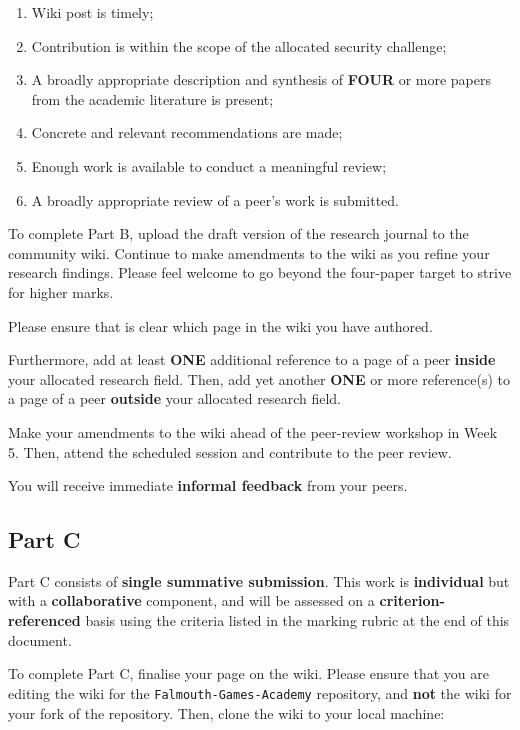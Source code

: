\documentclass{../../fal_assignment}
\begin{document}
\begin{enumerate}[label=(\alph*)]
	\item Wiki post is timely;
	\item Contribution is within the scope of the allocated security challenge;
	\item A broadly appropriate description and synthesis of \textbf{FOUR} or more papers from the academic literature is present;
	\item Concrete and relevant recommendations are made;
	\item Enough work is available to conduct a meaningful review;
	\item A broadly appropriate review of a peer's work is submitted.
\end{enumerate}

To complete Part B, upload the draft version of the research journal to the community wiki. Continue to make amendments to the wiki as you refine your research findings. 
Please feel welcome to go beyond the four-paper target to strive for higher marks.

Please ensure that is clear which page in the wiki you have authored.
 
Furthermore, add at least \textbf{ONE} additional reference to a page of a peer \textbf{inside} your allocated research field. Then, add yet another \textbf{ONE} or more reference(s) to a page of a peer \textbf{outside} your allocated research field. 

Make your amendments to the wiki ahead of the peer-review workshop in Week 5. Then, attend the scheduled session and contribute to the peer review.

You will receive immediate \textbf{informal feedback} from your peers.

\subsection*{Part C}

Part C consists of \textbf{single summative submission}. This work is \textbf{individual} but with a \textbf{collaborative} component, and will be assessed on a \textbf{criterion-referenced} basis using the criteria listed in the marking rubric at the end of this document.

To complete Part C, finalise your page on the wiki. Please ensure that you are editing the wiki for the \texttt{Falmouth-Games-Academy} repository,
and \textbf{not} the wiki for your fork of the repository. Then, clone the wiki to your local machine: 
\end{document}
